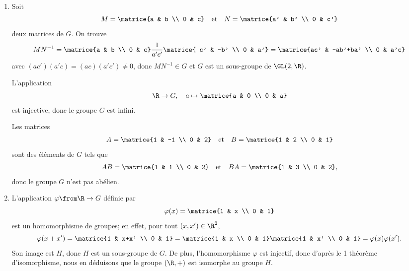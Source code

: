 \begin{enumerate}
  \item 
    Soit 
    \[
      M = \matrice{a & b \\ 0 & c}
      \quad\text{et}\quad 
      N = \matrice{a' & b' \\ 0 & c'}
    \]
    deux matrices de $G$. On trouve
    \[
      MN^ {-1} = \matrice{a & b \\ 0 & c} 
                  \dfrac{1}{a'c'} \matrice{ c' & -b' \\ 0 & a'}
               = \matrice{ac' & -ab'+ba' \\ 0 & a'c}
    \]
    avec $(ac')(a'c) = (ac)(a'c')\neq 0$, donc $MN^{-1}\in G$
    et $G$ est un sous-groupe de $\GL(2,\R)$.

    L'application 
    \[
      \R\to G,\quad a\mapsto\matrice{a & 0 \\ 0 & a}
    \]
    est injective, donc le groupe $G$ est infini.
   
    Les matrices 
    \[
      A = \matrice{1 & -1 \\ 0 & 2}
      \quad\text{et}\quad 
      B = \matrice{1 & 2 \\ 0 & 1}
    \]
    sont des éléments de $G$ tels que
    \begin{gather*}
      AB = \matrice{1 & 1 \\ 0 & 2} 
      \quad\text{et}\quad
      BA = \matrice{1 & 3 \\ 0 & 2},
    \end{gather*}
    donc le groupe $G$ n'est pas abélien.

  \item
    L'application $\varphi\from \R \to G$ définie par 
    \[
      \varphi(x) = \matrice{1 & x \\ 0 & 1}
    \]
    est un homomorphisme de groupes; en effet, pour tout $(x,x')\in\R^2$,
    \[
      \varphi(x+x') 
      = \matrice{1 & x+x' \\ 0 & 1} 
      = \matrice{1 & x \\ 0 & 1}\matrice{1 & x' \\ 0 & 1} 
      = \varphi(x)\varphi(x').
    \]
    Son image est $H$, donc $H$ est un sous-groupe de $G$.  De plus,
    l'homomorphisme $\varphi$ est injectif, donc d'après le 1 théorème
    d'isomorphisme, nous en déduisons que le groupe $(\R,+)$ est isomorphe au
    groupe $H$.


\end{enumerate}
